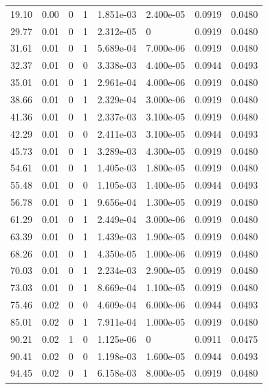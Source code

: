 \documentclass[preview]{standalone}
\begin{document}
{{\begin{tabular}{L{1.2cm}C{1.2cm} C{0.3cm}C{0.5cm} C{1.4cm}C{1.4cm} C{1.4cm}C{1.4cm}}
  19.10  &  0.00  & 0     &  1 &  1.851e-03  & 2.400e-05  & 0.0919 &  0.0480   \\ 
  29.77  &  0.01  & 0     &  1 &  2.312e-05  & 0  & 0.0919 &  0.0480   \\ 
  31.61  &  0.01  & 0     &  1 &  5.689e-04  & 7.000e-06  & 0.0919 &  0.0480   \\ 
  32.37  &  0.01  & 0     &  0 &  3.338e-03  & 4.400e-05  & 0.0944 &  0.0493   \\ 
  35.01  &  0.01  & 0     &  1 &  2.961e-04  & 4.000e-06  & 0.0919 &  0.0480   \\ 
  38.66  &  0.01  & 0     &  1 &  2.329e-04  & 3.000e-06  & 0.0919 &  0.0480   \\ 
  41.36  &  0.01  & 0     &  1 &  2.337e-03  & 3.100e-05  & 0.0919 &  0.0480   \\ 
  42.29  &  0.01  & 0     &  0 &  2.411e-03  & 3.100e-05  & 0.0944 &  0.0493   \\ 
  45.73  &  0.01  & 0     &  1 &  3.289e-03  & 4.300e-05  & 0.0919 &  0.0480   \\ 
  54.61  &  0.01  & 0     &  1 &  1.405e-03  & 1.800e-05  & 0.0919 &  0.0480   \\ 
  55.48  &  0.01  & 0     &  0 &  1.105e-03  & 1.400e-05  & 0.0944 &  0.0493   \\ 
  56.78  &  0.01  & 0     &  1 &  9.656e-04  & 1.300e-05  & 0.0919 &  0.0480   \\ 
  61.29  &  0.01  & 0     &  1 &  2.449e-04  & 3.000e-06  & 0.0919 &  0.0480   \\ 
  63.39  &  0.01  & 0     &  1 &  1.439e-03  & 1.900e-05  & 0.0919 &  0.0480   \\ 
  68.26  &  0.01  & 0     &  1 &  4.350e-05  & 1.000e-06  & 0.0919 &  0.0480   \\ 
  70.03  &  0.01  & 0     &  1 &  2.234e-03  & 2.900e-05  & 0.0919 &  0.0480   \\ 
  73.03  &  0.01  & 0     &  1 &  8.669e-04  & 1.100e-05  & 0.0919 &  0.0480   \\ 
  75.46  &  0.02  & 0     &  0 &  4.609e-04  & 6.000e-06  & 0.0944 &  0.0493   \\ 
  85.01  &  0.02  & 0     &  1 &  7.911e-04  & 1.000e-05  & 0.0919 &  0.0480   \\ 
  90.21  &  0.02  & 1     &  0 &  1.125e-06  & 0  & 0.0911 &  0.0475   \\ 
  90.41  &  0.02  & 0     &  0 &  1.198e-03  & 1.600e-05  & 0.0944 &  0.0493   \\ 
  94.45  &  0.02  & 0     &  1 &  6.158e-03  & 8.000e-05  & 0.0919 &  0.0480   \\ 

\end{tabular}}}
\end{document}

